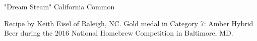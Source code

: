 \stylesection{\stylecaliforniacommon}

\begin{recipe}{"Dream Steam" California Common}

\begin{aboutblock}
Recipe by Keith Eisel of Raleigh, NC. Gold medal in Category 7: Amber Hybrid Beer
during the 2016 National Homebrew Competition in Baltimore, MD. \sourceaha
\end{aboutblock}


\begin{methodandtiming}

\begin{mashsteps}
\end{mashsteps}

\begin{fermentationsteps}
\end{fermentationsteps}

\end{methodandtiming}

\recipebreak

\begin{ingredientsblock}

\begin{malts}
\end{malts}

\begin{hops}
\end{hops}


\end{ingredientsblock}

\end{recipe}


